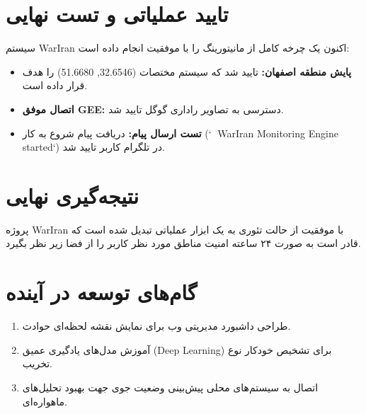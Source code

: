 \documentclass{article}
\begin{document}
\section{تایید عملیاتی و تست نهایی}
سیستم WarIran اکنون یک چرخه کامل از مانیتورینگ را با موفقیت انجام داده است:
\begin{itemize}
    \item \textbf{پایش منطقه اصفهان:} تایید شد که سیستم مختصات (32.6546, 51.6680) را هدف قرار داده است.
    \item \textbf{اتصال موفق GEE:} دسترسی به تصاویر راداری گوگل تایید شد.
    \item \textbf{تست ارسال پیام:} دریافت پیام شروع به کار (`🚀 WarIran Monitoring Engine started`) در تلگرام کاربر تایید شد.
\end{itemize}

\section{نتیجه‌گیری نهایی}
پروژه WarIran با موفقیت از حالت تئوری به یک ابزار عملیاتی تبدیل شده است که قادر است به صورت ۲۴ ساعته امنیت مناطق مورد نظر کاربر را از فضا زیر نظر بگیرد.

\section{گام‌های توسعه در آینده}
\begin{enumerate}
    \item طراحی داشبورد مدیریتی وب برای نمایش نقشه لحظه‌ای حوادث.
    \item آموزش مدل‌های یادگیری عمیق (Deep Learning) برای تشخیص خودکار نوع تخریب.
    \item اتصال به سیستم‌های محلی پیش‌بینی وضعیت جوی جهت بهبود تحلیل‌های ماهواره‌ای.
\end{enumerate}
\end{document}
